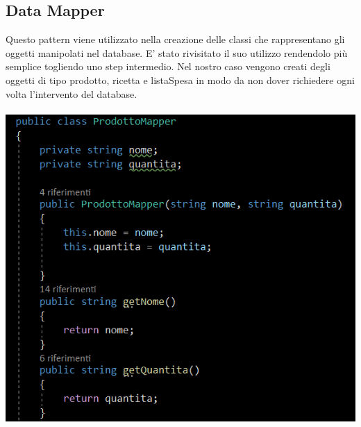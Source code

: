 \documentclass[a4paper, titlepage]{article}
\begin{document}
\subsection{Data Mapper}
Questo pattern viene utilizzato nella creazione delle classi che rappresentano gli oggetti manipolati nel database.
E' stato rivisitato il suo utilizzo rendendolo più semplice togliendo uno step intermedio.
Nel nostro caso vengono creati degli oggetti di tipo prodotto, ricetta e listaSpesa in modo da non dover richiedere ogni volta l'intervento del database.\\\\
\includegraphics[scale=0.70]{Immagini/DataMapper.PNG}
\newpage
\end{document}
